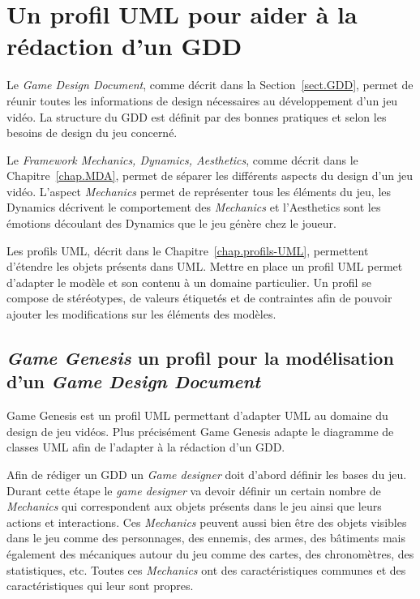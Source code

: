 \chapter{Un profil UML pour aider à la rédaction d'un GDD}
\label{game-genesis.sect}
Le \emph{Game Design Document}, comme décrit dans la Section~\ref{sect.GDD}, permet de réunir toutes les informations de design nécessaires au développement d'un jeu vidéo. La structure du GDD est définit par des bonnes pratiques et selon les besoins de design du jeu concerné.

Le \emph{Framework Mechanics, Dynamics, Aesthetics}, comme décrit dans le Chapitre~\ref{chap.MDA}, permet de séparer les différents aspects du design d'un jeu vidéo. L'aspect \emph{Mechanics} permet de représenter tous les éléments du jeu, les Dynamics décrivent le comportement des \emph{Mechanics} et l'Aesthetics sont les émotions découlant des Dynamics que le jeu génère chez le joueur.

Les profils UML, décrit dans le Chapitre~\ref{chap.profils-UML}, permettent d'étendre les objets présents dans UML. Mettre en place un profil UML permet d'adapter le modèle et son contenu à un domaine particulier. Un profil se compose de stéréotypes, de valeurs étiquetés et de contraintes afin de pouvoir ajouter les modifications sur les éléments des modèles.


\section{\emph{Game Genesis} un profil pour la modélisation d'un \emph{Game Design Document} }
\label{sect.gg_what}
Game Genesis est un profil UML permettant d'adapter UML au domaine du design de jeu vidéos. 
Plus précisément Game Genesis adapte le diagramme de classes UML afin de l'adapter à la rédaction d'un GDD.

Afin de rédiger un GDD un \emph{Game designer} doit d'abord définir les bases du jeu.
Durant cette étape le \emph{game designer} va devoir définir un certain nombre de \emph{Mechanics} qui correspondent aux objets présents dans le jeu ainsi que leurs actions et interactions.
Ces \emph{Mechanics} peuvent aussi bien être des objets visibles dans le jeu comme des personnages, des ennemis, des armes, des bâtiments mais également des mécaniques autour du jeu comme des cartes, des chronomètres, des statistiques, etc.
Toutes ces \emph{Mechanics} ont des caractéristiques communes et des caractéristiques qui leur sont propres.

